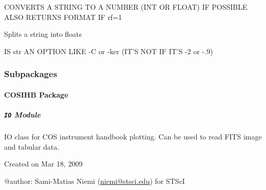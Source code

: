\documentclass[letterpaper,10pt,english]{sphinxmanual}
\begin{document}
\begin{fulllineitems}
\label{SamPy.plot:SamPy.plot.trilogy.str2num}
CONVERTS A STRING TO A NUMBER (INT OR FLOAT) IF POSSIBLE
ALSO RETURNS FORMAT IF rf=1

\end{fulllineitems}



\begin{fulllineitems}
\label{SamPy.plot:SamPy.plot.trilogy.stringsplitatof}
Splits a string into floats

\end{fulllineitems}



\begin{fulllineitems}
\label{SamPy.plot:SamPy.plot.trilogy.striskey}
IS str AN OPTION LIKE -C or -ker
(IT'S NOT IF IT'S -2 or -.9)

\end{fulllineitems}



\subsubsection{Subpackages}
\label{SamPy.plot:subpackages}

\paragraph{COSIHB Package}
\label{SamPy.plot.COSIHB:cosihb-package}\label{SamPy.plot.COSIHB::doc}

\subparagraph{\texttt{IO} Module}
\label{SamPy.plot.COSIHB:module-SamPy.plot.COSIHB.IO}\label{SamPy.plot.COSIHB:io-module}
IO class for COS instrument handbook plotting.
Can be used to read FITS image and tabular data.

Created on Mar 18, 2009

@author: Sami-Matias Niemi (\href{mailto:niemi@stsci.edu}{niemi@stsci.edu}) for STScI

\end{document}
